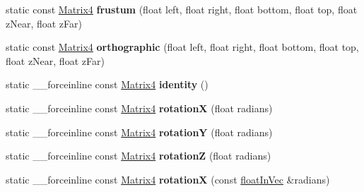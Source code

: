 \begin{DoxyCompactItemize}
\item 
\hypertarget{classVectormath_1_1Aos_1_1Matrix4_ad1b95c29754cf39128f5c90779a53d2e}{static const \hyperlink{classVectormath_1_1Aos_1_1Matrix4}{Matrix4} {\bfseries frustum} (float left, float right, float bottom, float top, float z\-Near, float z\-Far)}\label{classVectormath_1_1Aos_1_1Matrix4_ad1b95c29754cf39128f5c90779a53d2e}

\item 
\hypertarget{classVectormath_1_1Aos_1_1Matrix4_af2bb0513df5fa3be77b5cef316c94249}{static const \hyperlink{classVectormath_1_1Aos_1_1Matrix4}{Matrix4} {\bfseries orthographic} (float left, float right, float bottom, float top, float z\-Near, float z\-Far)}\label{classVectormath_1_1Aos_1_1Matrix4_af2bb0513df5fa3be77b5cef316c94249}

\item 
\hypertarget{classVectormath_1_1Aos_1_1Matrix4_ac4c9236d11032f5432476e4615c536da}{static \-\_\-\-\_\-forceinline const \hyperlink{classVectormath_1_1Aos_1_1Matrix4}{Matrix4} {\bfseries identity} ()}\label{classVectormath_1_1Aos_1_1Matrix4_ac4c9236d11032f5432476e4615c536da}

\item 
\hypertarget{classVectormath_1_1Aos_1_1Matrix4_afd5ea144110406306a40eccdf690cb92}{static \-\_\-\-\_\-forceinline const \hyperlink{classVectormath_1_1Aos_1_1Matrix4}{Matrix4} {\bfseries rotation\-X} (float radians)}\label{classVectormath_1_1Aos_1_1Matrix4_afd5ea144110406306a40eccdf690cb92}

\item 
\hypertarget{classVectormath_1_1Aos_1_1Matrix4_a4ac71bc4e87eaea4271e66724f3a14c3}{static \-\_\-\-\_\-forceinline const \hyperlink{classVectormath_1_1Aos_1_1Matrix4}{Matrix4} {\bfseries rotation\-Y} (float radians)}\label{classVectormath_1_1Aos_1_1Matrix4_a4ac71bc4e87eaea4271e66724f3a14c3}

\item 
\hypertarget{classVectormath_1_1Aos_1_1Matrix4_aacf79f8f249238e88bbbc2efa3ba715c}{static \-\_\-\-\_\-forceinline const \hyperlink{classVectormath_1_1Aos_1_1Matrix4}{Matrix4} {\bfseries rotation\-Z} (float radians)}\label{classVectormath_1_1Aos_1_1Matrix4_aacf79f8f249238e88bbbc2efa3ba715c}

\item 
\hypertarget{classVectormath_1_1Aos_1_1Matrix4_ac5f175f5fb2b4b78213e063aff01cf9a}{static \-\_\-\-\_\-forceinline const \hyperlink{classVectormath_1_1Aos_1_1Matrix4}{Matrix4} {\bfseries rotation\-X} (const \hyperlink{classVectormath_1_1floatInVec}{float\-In\-Vec} \&radians)}\label{classVectormath_1_1Aos_1_1Matrix4_ac5f175f5fb2b4b78213e063aff01cf9a}


\end{DoxyCompactItemize}
